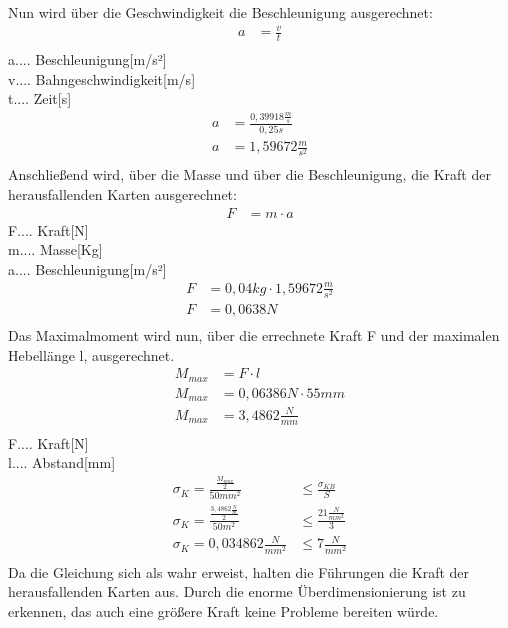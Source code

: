 Nun wird über die Geschwindigkeit die Beschleunigung ausgerechnet:
\begin{align*}
a &= \frac{v}{t}\\
\end{align*}
a.... Beschleunigung[m/s²]\\
v.... Bahngeschwindigkeit[m/s]\\
t.... Zeit[s]\\
\begin{align*}
a &= \frac{0,39918\tfrac{m}{s}}{0,25s}\\
a &= 1,59672\tfrac{m}{s^{2}}\\
\end{align*}
Anschließend wird, über die Masse und über die Beschleunigung, die Kraft der herausfallenden Karten ausgerechnet:
\begin{align*}
F &= m \cdot a
\end{align*}
F.... Kraft[N]\\
m.... Masse[Kg]\\
a.... Beschleunigung[m/s²]\\
\begin{align*}
F &= 0,04 kg \cdot 1,59672\tfrac{m}{s^{2}}\\
F &= 0,0638N\\
\end{align*}
Das Maximalmoment wird nun, über die errechnete Kraft F und der maximalen Hebellänge l, ausgerechnet.
\begin{align*}
M_{max} &= F\cdot l\\
M_{max} &= 0,06386N\cdot 55mm\\
M_{max} &= 3,4862\tfrac{N}{mm}\\
\end{align*}
F.... Kraft[N]\\
l.... Abstand[mm]\\

\begin{align*}
\sigma _{K} = {\frac{\frac{M_{max}}{2}}{50mm^{2}}} &\leq \frac{\sigma _{KB}}{S}\\
\sigma _{K}= \frac{\frac{3,4862\tfrac{N}{m}}{2}}{50m^{2}} &\leq  \frac{21 \tfrac{N}{mm^{2}}}{3}\\
\sigma _{K} = 0,034862 \tfrac{N}{mm^{2}} &\leq 7 \tfrac{N}{mm^{2}}\\
\end{align*}
Da die Gleichung sich als wahr erweist, halten die Führungen die Kraft der herausfallenden Karten
aus.
Durch die enorme Überdimensionierung ist zu erkennen, das auch eine größere Kraft
keine Probleme bereiten würde.

